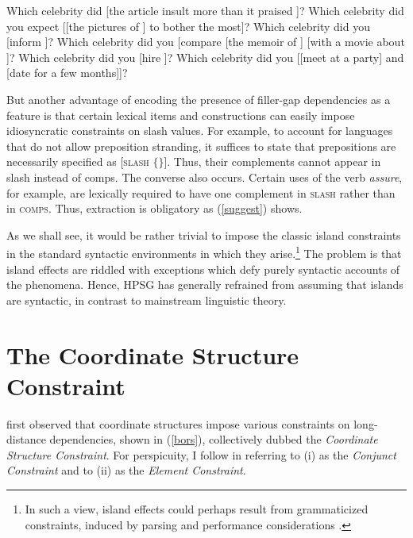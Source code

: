 \documentclass[output=paper
                ,modfonts
                ,nonflat
	        ,collection
	        ,collectionchapter
	        ,collectiontoclongg
 	        ,biblatex
                ,babelshorthands
                ,newtxmath
                ,draftmode
                ,colorlinks, citecolor=brown
]{./langsci/langscibook}
\begin{document}
\eal  \label{cc5}
\ex Which celebrity did  [the article insult \spc more than it praised \spc]?
\ex  Which celebrity  did you expect [[the pictures of \spc ] to bother \spc the most]?
\ex Which celebrity did you [inform ]?
\ex Which celebrity did you [compare [the memoir of \spc] [with a movie about \spc]?
\ex Which celebrity  did you [hire ]?
\ex Which celebrity  did you [[meet \spcs at a party] and [date \spcs for a few months]]?
\zl 

But another advantage of encoding the presence of filler-gap dependencies as a feature is that
certain lexical items and constructions can easily impose idiosyncratic constraints on {\sc slash}
values. For example, to account for  languages that do not allow preposition stranding,
it suffices to state that prepositions are necessarily specified as $[$\textsc{slash} $\lbrace \rbrace]$. Thus,
their complements cannot appear in {\sc slash} instead of {\sc comps}. 
The converse also occurs. Certain uses of the verb \emph{assure}, for example, 
are lexically required to have one complement in \textsc{slash} rather
   than in \textsc{comps}. Thus, extraction is obligatory as (\ref{suggest}) shows.
   
\eal \label{suggest}   
\zl

As we shall see, it would be rather trivial to impose the classic island constraints in the standard syntactic
environments in which they arise.\footnote{In such a view, island effects could perhaps result from
grammaticized constraints, induced by parsing and performance considerations  
\citep{prichett,fodor78,fodor83-removed}.}
 The problem is that island effects are riddled with exceptions which
defy purely syntactic accounts of the phenomena.  Hence, HPSG has generally refrained from
assuming that islands are syntactic, in contrast to mainstream linguistic theory.


\section{The Coordinate Structure Constraint}

\citet{Ross67} first observed that coordinate structures
impose various constraints on long-distance dependencies, shown in  (\ref{bors}), collectively dubbed the
\emph{Coordinate Structure Constraint}. For perspicuity,  I  follow \citet{grosu73} in referring to (i) as the \emph{Conjunct Constraint} and to (ii) as the \emph{Element Constraint}.
\end{document}
